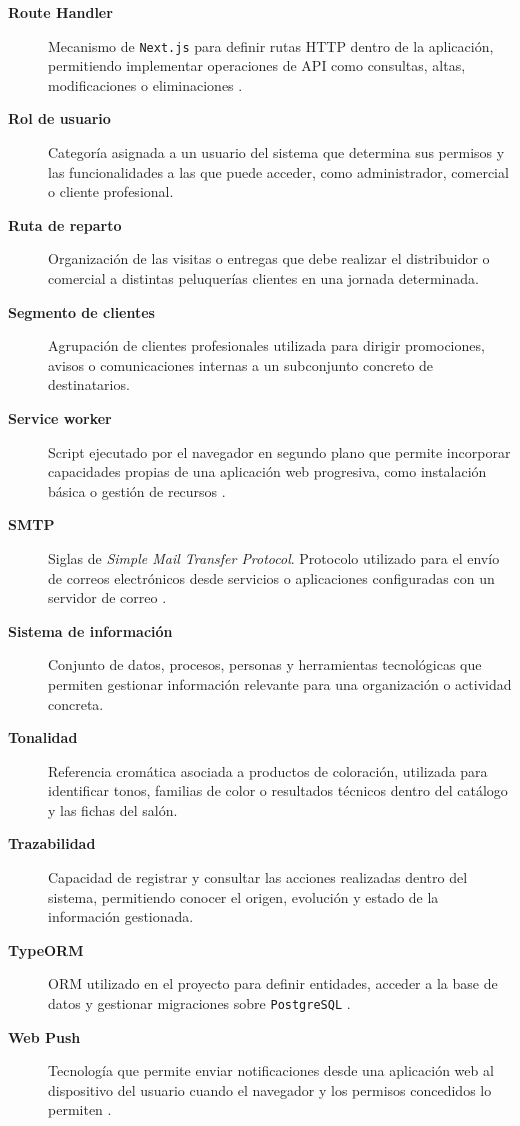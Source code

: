 \begin{description}
\item[\textbf{Route Handler}]
Mecanismo de \texttt{Next.js} para definir rutas HTTP dentro de la aplicación, permitiendo implementar operaciones de API como consultas, altas, modificaciones o eliminaciones \citep{nextjsroutefile2026,nextjsroutehandlers2026}.

\item[\textbf{Rol de usuario}]
Categoría asignada a un usuario del sistema que determina sus permisos y las funcionalidades a las que puede acceder, como administrador, comercial o cliente profesional.

\item[\textbf{Ruta de reparto}]
Organización de las visitas o entregas que debe realizar el distribuidor o comercial a distintas peluquerías clientes en una jornada determinada.

\item[\textbf{Segmento de clientes}]
Agrupación de clientes profesionales utilizada para dirigir promociones, avisos o comunicaciones internas a un subconjunto concreto de destinatarios.

\item[\textbf{Service worker}]
Script ejecutado por el navegador en segundo plano que permite incorporar capacidades propias de una aplicación web progresiva, como instalación básica o gestión de recursos \citep{webdev-pwa}.

\item[\textbf{SMTP}]
Siglas de \textit{Simple Mail Transfer Protocol}. Protocolo utilizado para el envío de correos electrónicos desde servicios o aplicaciones configuradas con un servidor de correo \citep{nodemailersmtp2026}.

\item[\textbf{Sistema de información}]
Conjunto de datos, procesos, personas y herramientas tecnológicas que permiten gestionar información relevante para una organización o actividad concreta.

\item[\textbf{Tonalidad}]
Referencia cromática asociada a productos de coloración, utilizada para identificar tonos, familias de color o resultados técnicos dentro del catálogo y las fichas del salón.

\item[\textbf{Trazabilidad}]
Capacidad de registrar y consultar las acciones realizadas dentro del sistema, permitiendo conocer el origen, evolución y estado de la información gestionada.

\item[\textbf{TypeORM}]
ORM utilizado en el proyecto para definir entidades, acceder a la base de datos y gestionar migraciones sobre \texttt{PostgreSQL} \citep{typeormentities2026,typeormmigrations2026}.

\item[\textbf{Web Push}]
Tecnología que permite enviar notificaciones desde una aplicación web al dispositivo del usuario cuando el navegador y los permisos concedidos lo permiten \citep{webpushapi2026}.

\end{description}
